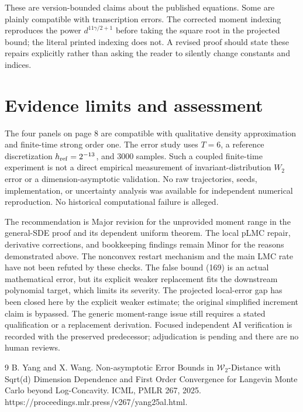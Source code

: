 \documentclass[10pt]{article}
\begin{document}
These are version-bounded claims about the published equations. Some are plainly compatible with transcription errors. The corrected moment indexing reproduces the power \(d^{11\gamma/2+1}\) before taking the square root in the projected bound; the literal printed indexing does not. A revised proof should state these repairs explicitly rather than asking the reader to silently change constants and indices.\par
\section*{Evidence limits and assessment}
The four panels on page 8 are compatible with qualitative density approximation and finite-time strong order one. The error study uses \(T=6\), a reference discretization \(h_{\rm ref}=2^{-13}\), and 3000 samples. Such a coupled finite-time experiment is not a direct empirical measurement of invariant-distribution \(W_2\) error or a dimension-asymptotic validation. No raw trajectories, seeds, implementation, or uncertainty analysis was available for independent numerical reproduction. No historical computational failure is alleged.\par
The recommendation is Major revision for the unprovided moment range in the general-SDE proof and its dependent uniform theorem. The local pLMC repair, derivative corrections, and bookkeeping findings remain Minor for the reasons demonstrated above. The nonconvex restart mechanism and the main LMC rate have not been refuted by these checks. The false bound (169) is an actual mathematical error, but its explicit weaker replacement fits the downstream polynomial target, which limits its severity. The projected local-error gap has been closed here by the explicit weaker estimate; the original simplified increment claim is bypassed. The generic moment-range issue still requires a stated qualification or a replacement derivation. Focused independent AI verification is recorded with the preserved predecessor; adjudication is pending and there are no human reviews.\par
9 B. Yang and X. Wang. Non-asymptotic Error Bounds in \(\mathcal W_2\)-Distance with Sqrt(d) Dimension Dependence and First Order Convergence for Langevin Monte Carlo beyond Log-Concavity. ICML, PMLR 267, 2025. https://proceedings.mlr.press/v267/yang25al.html.\par
\end{document}
